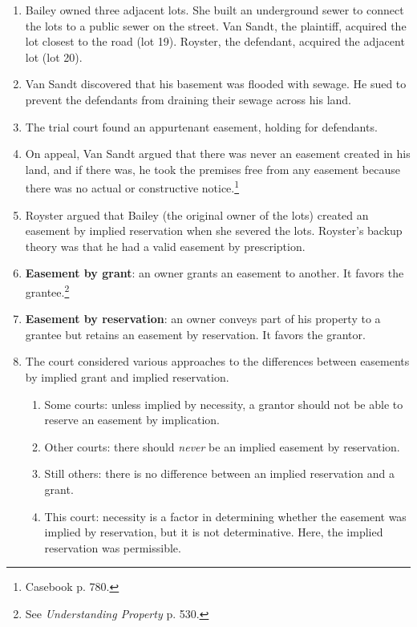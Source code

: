 \begin{enumerate}
    \item Bailey owned three adjacent lots. She built an underground sewer to 
    connect the lots to a public sewer on the street. Van Sandt, the 
    plaintiff, acquired the lot closest to the road (lot 19). Royster, the 
    defendant, acquired the adjacent lot (lot 20).
    \item Van Sandt discovered that his basement was flooded with sewage. He 
    sued to prevent the defendants from draining their sewage across his land.
    \item The trial court found an appurtenant easement, holding for 
    defendants.
    \item On appeal, Van Sandt argued that there was never an easement 
    created in his land, and if there was, he took the premises free from any 
    easement because there was no actual or constructive 
    notice.\footnote{Casebook p. 780.}
    \item Royster argued that Bailey (the original owner of the lots) created 
    an easement by implied reservation when she severed the lots. Royster's 
    backup theory was that he had a valid easement by prescription.
    \item \textbf{Easement by grant}: an owner grants an easement to another. 
    It favors the grantee.\footnote{See \emph{Understanding Property} p. 530.}
    \item \textbf{Easement by reservation}: an owner conveys part of his 
    property to a grantee but retains an easement by reservation. It favors 
    the grantor.
    \item The court considered various approaches to the differences between 
    easements by implied grant and implied reservation.
    \begin{enumerate}
        \item Some courts: unless implied by necessity, a grantor should not 
        be able to reserve an easement by implication.
        \item Other courts: there should \emph{never} be an implied easement 
        by reservation.
        \item Still others: there is no difference between an implied 
        reservation and a grant.
        \item This court: necessity is a factor in determining whether the 
        easement was implied by reservation, but it is not determinative. 
        Here, the implied reservation was permissible.
    \end{enumerate}

\end{enumerate}
